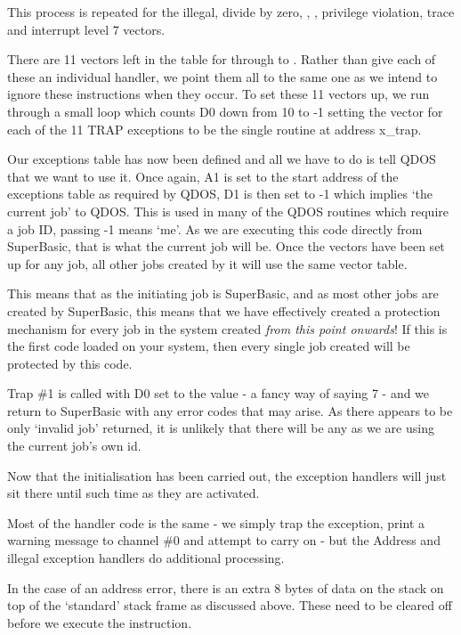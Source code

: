 This process is repeated for the illegal, divide by zero, ,
    , privilege violation, trace and interrupt level 7 vectors.

There are 11 vectors left in the table for  through to . Rather than give each of these an individual handler, we point them all to
    the same one as we intend to ignore these instructions when they occur. To
    set these 11 vectors up, we run through a small loop which counts D0 down
    from 10 to -{}1 setting the vector for each of the 11 TRAP exceptions to be
    the single routine at address x\_trap.

Our exceptions table has now been defined and all we have to do is
    tell QDOS that we want to use it. Once again, A1 is set to the start
    address of the exceptions table as required by QDOS, D1 is then set to -{}1
    which implies `the current job' to QDOS. This is used in many of the QDOS
    routines which require a job ID, passing -{}1 means `me'. As we are
    executing this code directly from SuperBasic, that is what the current job
    will be. Once the vectors have been set up for any job, all other jobs
    created by it will use the same vector table.

This means that as the initiating job is SuperBasic, and as most
    other jobs are created by SuperBasic, this means that we have effectively
    created a protection mechanism for every job in the system created \emph{from this point onwards}! If this is the first code loaded on your system, then
    every single job created will be protected by this code.

Trap \#1 is called with D0 set to the value  -{} a fancy way of
    saying 7 -{} and we return to SuperBasic with any error codes that may
    arise. As there appears to be only `invalid job' returned, it is unlikely
    that there will be any as we are using the current job's own id.

Now that the initialisation has been carried out, the exception
    handlers will just sit there until such time as they are activated.

Most of the handler code is the same -{} we simply trap the exception,
    print a warning message to channel \#0 and attempt to carry on -{} but the
    Address and illegal exception handlers do additional processing.

In the case of an address error, there is an extra 8 bytes of data
    on the stack on top of the `standard' stack frame as discussed above.
    These need to be cleared off before we execute the  instruction.

